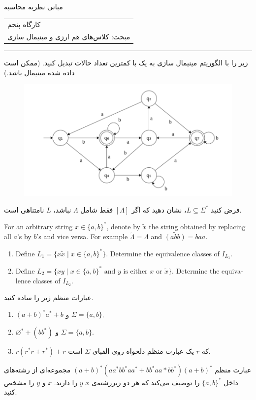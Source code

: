 \documentclass{article}
\newcommand*\circled[1]{
	\tikz[baseline=(char.base)]{
		\node[shape=circle,draw,inner sep=-1pt,color=red] (char) {\textcolor{black}{#1}\strut}
	}\kern-3pt
}
\renewcommand{\labelenumii}{\alph{enumii})}
\let\oldlabelenumii=\labelenumii
\newcommand{\StartCircledEnumii}{\renewcommand{\labelenumii}{\circled{\oldlabelenumii}}}
\newcommand{\EndCircledEnumii}{\renewcommand{\labelenumii}{\oldlabelenumii}}
\newcommand{\CircledEnumii}{\StartCircledEnumii\item\EndCircledEnumii}
\begin{document}
	\begin{center}
		\Huge
		مبانی نظریه محاسبه
	\end{center}
	\Large
	\begin{tabularx}{\linewidth}{>{\raggedleft\arraybackslash}X}
		کارگاه پنجم
		\\
		مبحث: کلاس‌های هم ارزی و مینیمال سازی
		\\
		
	\end{tabularx}
	\rule{\textwidth}{1pt}
	\large
	\begin{enumerate}
		\item 
		زیر را با الگوریتم مینیمال سازی به یک 
		با کمترین تعداد حالات
		 تبدیل کنید. (ممکن است  داده شده مینیمال باشد.)
		 	\begin{figure}[h]
		 	\centering
		 	\includegraphics[width=0.7\linewidth]{image}
		 \end{figure}
		 \item 
		 فرض کنید $L \subseteq \Sigma^*$، نشان دهید که اگر 
		 $[\Lambda]$
		 فقط شامل 
		 $\Lambda$
		 نباشد، $L$ نامتناهی است.
		 \begin{latin}
		 	\item 
		 	For an arbitrary string $x \in \{a,b\}^*$, denote by $\tilde{x}$ the string obtained by replacing all $a$'s by $b$'s and vice versa. For example $\tilde{\Lambda} = \Lambda$ and $\widetilde{(abb)} = baa$.
		 	\begin{enumerate}
		 		\item Define $L_1 = \{x\tilde{x} \; | \; x \in \{a,b\}^*\}$. Determine the equivalence classes of $I_{L_1}$.
		 		\CircledEnumii Define $L_2 = \{xy \; | \; \text{$x \in \{a,b\}^*$ and $y$ is either $x$ or $\tilde{x}$}\}$. Determine the equivalence classes of $I_{L_2}$.
		 	\end{enumerate}
		 \end{latin}
		\item 
		عبارات منظم زیر را ساده کنید.
		\begin{enumerate}
			\item $(a+b)^*a^* + b$ و $\Sigma = \{a,b\}$.
			\item $\varnothing^* + (bb^*)$ و $\Sigma = \{a,b\}$.
			\item $r(r^*r+r^*)+r$ 
			که $r$ یک عبارت منظم دلخواه روی الفبای $\Sigma$ است.
		\end{enumerate}
	\item
	عبارت منظم 
	$(a+b)^*(aa^*bb^*aa^* + bb^*aa*bb^*)(a+b)^*$
	مجموعه‌ای از رشته‌های داخل 
	$\{a,b\}^*$
	را توصیف می‌کند که هر دو زیررشته‌ی $x$ $y$ را دارند. $x$ و $y$ را مشخص کنید.

	
\end{enumerate}
\end{document}
